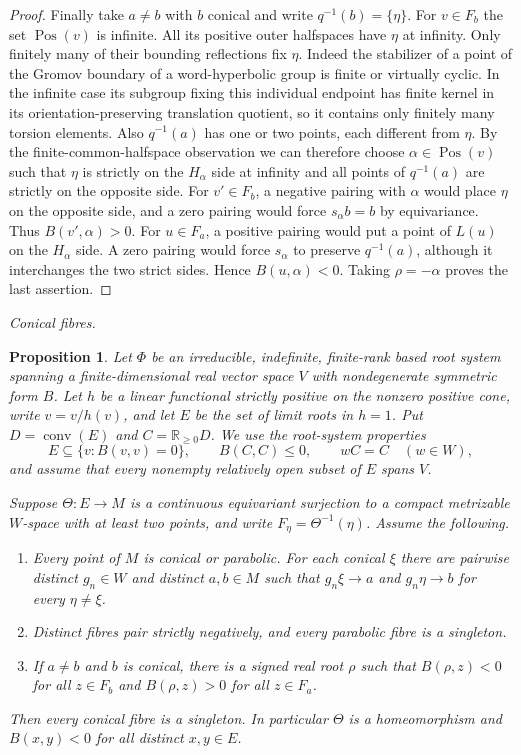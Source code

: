 \documentclass[11pt,reqno]{amsart}
\theoremstyle{plain}
\newtheorem{proposition}[theorem]{Proposition}
\theoremstyle{definition}
\theoremstyle{remark}
\numberwithin{equation}{section}
\begin{document}
\begin{proof}
Finally take $a\ne b$ with $b$ conical and write
$q^{-1}(b)=\{\eta\}$. For $v\in F_b$ the set
$\operatorname{Pos}(v)$ is infinite. All its positive outer
halfspaces have $\eta$ at infinity. Only finitely many of their
bounding reflections fix $\eta$. Indeed the stabilizer of a point
of the Gromov boundary of a word-hyperbolic group is finite or
virtually cyclic. In the infinite case its subgroup fixing this
individual endpoint has finite kernel in its orientation-preserving
translation quotient, so it contains only finitely many torsion
elements. Also $q^{-1}(a)$ has one or two points, each different
from $\eta$. By the finite-common-halfspace observation we can
therefore choose $\alpha\in\operatorname{Pos}(v)$ such that
$\eta$ is strictly on the $H_\alpha$ side at infinity and all
points of $q^{-1}(a)$ are strictly on the opposite side.
For $v'\in F_b$, a negative pairing with $\alpha$ would place
$\eta$ on the opposite side, and a zero pairing would force
$s_\alpha b=b$ by equivariance. Thus $B(v',\alpha)>0$.
For $u\in F_a$, a positive pairing would put a point of $L(u)$
on the $H_\alpha$ side. A zero pairing would force $s_\alpha$
to preserve $q^{-1}(a)$, although it interchanges the two strict
sides. Hence $B(u,\alpha)<0$. Taking $\rho=-\alpha$ proves the
last assertion.
\end{proof}

\par\medskip
\noindent\emph{Conical fibres.}

\begin{proposition}\label{p14:fibres}
Let $\Phi$ be an irreducible, indefinite, finite-rank based root system
spanning a finite-dimensional real vector space $V$ with nondegenerate
symmetric form $B$. Let $h$ be a linear functional strictly positive on
the nonzero positive cone, write $\widehat v=v/h(v)$, and let $E$ be the
set of limit roots in $h=1$. Put $D=\operatorname{conv}(E)$ and
$C=\mathbb R_{\geq 0}D$. We use the root-system properties
\[
 E\subseteq\{v:B(v,v)=0\},\qquad B(C,C)\leq 0,\qquad wC=C\quad(w\in W),
\]
and assume that every nonempty relatively open subset of $E$ spans $V$.

Suppose $\Theta:E\to M$ is a continuous equivariant surjection to a
compact metrizable $W$-space with at least two points, and write
$F_\eta=\Theta^{-1}(\eta)$. Assume the following.
\begin{enumerate}
\item Every point of $M$ is conical or parabolic. For each conical
$\xi$ there are pairwise distinct $g_n\in W$ and distinct $a,b\in M$
such that $g_n\xi\to a$ and $g_n\eta\to b$ for every $\eta\ne\xi$.
\item Distinct fibres pair strictly negatively, and every parabolic
fibre is a singleton.
\item If $a\ne b$ and $b$ is conical, there is a signed real root $\rho$
such that $B(\rho,z)<0$ for all $z\in F_b$ and $B(\rho,z)>0$ for all
$z\in F_a$.
\end{enumerate}
Then every conical fibre is a singleton. In particular $\Theta$ is a
homeomorphism and $B(x,y)<0$ for all distinct $x,y\in E$.
\end{proposition}
\end{document}
